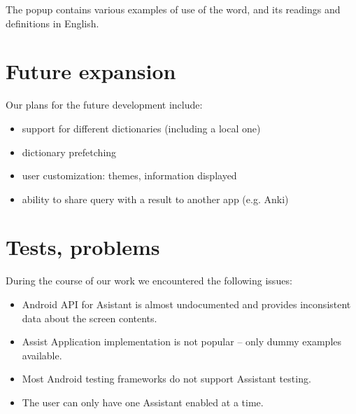 \documentclass[11pt,a4paper]{article}
\begin{document}
The popup contains various examples of use of the word,
and its readings and definitions in English.

\newpage

\section{Future expansion}

Our plans for the future development include:
\begin{itemize}
    \item support for different dictionaries (including a local one)
    \item dictionary prefetching
    \item user customization: themes, information displayed
    \item ability to share query with a result to another app (e.g. Anki)
\end{itemize}

\section{Tests, problems}

During the course of our work we encountered the following issues:
\begin{itemize}
    \item Android API for Asistant is almost undocumented
        and provides inconsistent data about the screen contents.
    \item Assist Application implementation is not popular --
        only dummy examples available.
    \item Most Android testing frameworks do not support Assistant testing.
    \item The user can only have one Assistant enabled at a time.
\end{itemize}
\end{document}
